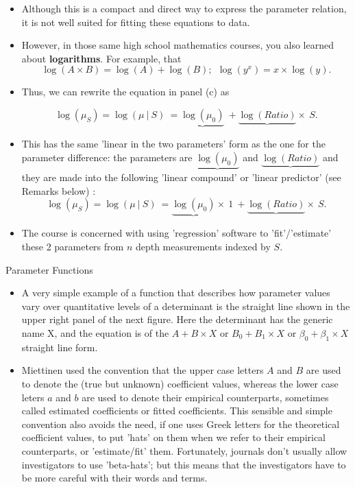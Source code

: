 \documentclass[10pt]{beamer}\usepackage[]{graphicx}\usepackage[]{color}
\begin{document}
\begin{frame}
\begin{itemize}
	\item Although this is a compact and direct way to express the
	parameter relation, it is not well suited for fitting these equations to data. 
	
\item 	However, in those same  high school mathematics courses, you also learned about \textbf{logarithms}. For example, that 
	$$\log(A \times B) = \log(A) + \log(B); \ \  \log(y^x) = x \times \log(y).$$
	\pause 
	\item Thus, we can rewrite the equation in panel (c) as
	
	$$\log(\mu_S) = \log(\mu \ | \ S)  \ = \underbrace{\log(\mu_0)} \ +  \underbrace{\log(Ratio)} \times \ S.$$
	
	\item This has the same 'linear in the two parameters' form as the one for the parameter difference: the parameters are
	$\underbrace{\log(\mu_0)}$ and $\underbrace{\log(Ratio)}$ and they are made into the following 'linear compound' or 'linear predictor' (see Remarks below) :
	$$\log(\mu_S) = \log(\mu \ | \ S)  \ = \underbrace{\log(\mu_0)} \times \ 1 \ + \underbrace{\log(Ratio)} \times \ S.$$
	\pause 
\item 	The course is concerned with using 'regression' software to  'fit'/'estimate' these 2 parameters from $n$ depth measurements indexed by $S$.
	
\end{itemize}
\end{frame}


\begin{frame}{Parameter Functions}
\begin{itemize}
	\item A very simple example of a function that describes how  parameter values vary over quantitative levels of a determinant is the straight line shown in the upper right panel of the next figure. Here the determinant has the generic name X, and the equation is of the $A + B \times X$ or $B_0 + B_1 \times X$ or $\beta_0 + \beta_1 \times X$ straight line form. 
	
	\item Miettinen used the convention that the upper case letters $A$ and $B$ are used to denote the (true but unknown) coefficient values, whereas the lower case leters $a$ and $b$ are used to denote their empirical counterparts, sometimes called estimated coefficients or fitted coefficients.  This sensible and simple convention also avoids the need, if one uses Greek letters for the theoretical coefficient values, to put 'hats' on them when we refer to their empirical counterparts, or 'estimate/fit' them. Fortunately, journals don't usually allow investigators to use 'beta-hats'; but this means that the investigators have to be more careful with their words and terms.
	

\end{itemize}
\end{frame}
\end{document}
